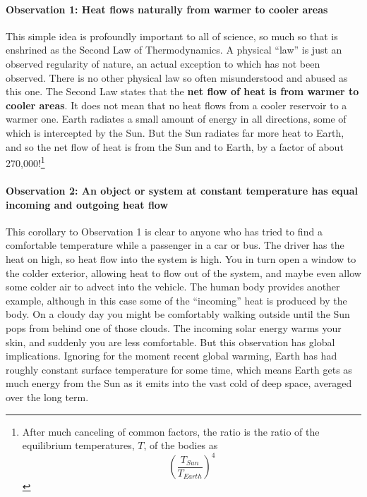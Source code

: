 \documentclass[amstex,12pt]{book}
\begin{document}
\paragraph{Observation 1: Heat flows naturally from warmer to cooler areas}\label{obs_1}
This simple idea is profoundly important to all of science, so much so that is enshrined as the Second Law of Thermodynamics. A physical ``law'' is just an observed regularity of nature, an actual exception to which has not been observed. There is no other physical law so often misunderstood and abused as this one. The Second Law states that the \textbf{net flow of heat is from warmer to cooler areas}. It does not mean that no heat flows from a cooler reservoir to a warmer one. Earth radiates a small amount of energy in all directions, some of which is intercepted by the Sun. But the Sun radiates far more heat to Earth, and so the net flow of heat is from the Sun and to Earth, by a factor of about 270,000!\footnote{After much canceling of common factors, the ratio is the ratio of the equilibrium temperatures, $T$, of the bodies as
	\[ \left(\frac{T_{Sun}}{T_{Earth}}\right)^4 \] }

\paragraph{Observation 2: An object or system at constant temperature has equal incoming and outgoing heat flow}\label{obs_2}
This corollary to Observation 1 is clear to anyone who has tried to find a comfortable temperature while a passenger in a car or bus. The driver has the heat on high, so heat flow into the system is high. You in turn open a window to the colder exterior, allowing heat to flow out of the system, and maybe even allow some colder air to advect into the vehicle. The human body provides another example, although in this case some of the ``incoming'' heat is produced by the body. On a cloudy day you might be comfortably walking outside until the Sun pops from behind one of those clouds. The incoming solar energy warms your skin, and suddenly you are less comfortable. But this observation has global implications. Ignoring for the moment recent global warming, Earth has had roughly constant surface temperature for some time, which means Earth gets as much energy from the Sun as it emits into the vast cold of deep space, averaged over the long term.
 
\end{document}
